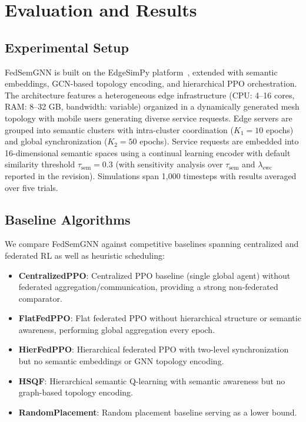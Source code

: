 \section{Evaluation and Results}
\label{sec:evaluation}

\subsection{Experimental Setup}
FedSemGNN is built on the EdgeSimPy platform~\cite{edgesimpy}, extended with semantic embeddings, GCN-based topology encoding, and hierarchical PPO orchestration. The architecture features a heterogeneous edge infrastructure (CPU: 4--16 cores, RAM: 8--32 GB, bandwidth: variable) organized in a dynamically generated mesh topology with mobile users generating diverse service requests. Edge servers are grouped into semantic clusters with intra-cluster coordination ($K_1=10$ epochs) and global synchronization ($K_2=50$ epochs). Service requests are embedded into 16-dimensional semantic spaces using a continual learning encoder with default similarity threshold $\tau_{\text{sem}}=0.3$ (with sensitivity analysis over $\tau_{\text{sem}}$ and $\lambda_{\text{ewc}}$ reported in the revision). Simulations span 1,000 timesteps with results averaged over five trials.

\subsection{Baseline Algorithms}
We compare FedSemGNN against competitive baselines spanning centralized and federated RL as well as heuristic scheduling:

\begin{itemize}
	\item \textbf{CentralizedPPO}: Centralized PPO baseline (single global agent) without federated aggregation/communication, providing a strong non-federated comparator.
	\item \textbf{FlatFedPPO}: Flat federated PPO without hierarchical structure or semantic awareness, performing global aggregation every epoch.
	\item \textbf{HierFedPPO}: Hierarchical federated PPO with two-level synchronization but no semantic embeddings or GNN topology encoding.
	\item \textbf{HSQF}: Hierarchical semantic Q-learning with semantic awareness but no graph-based topology encoding.
	\item \textbf{RandomPlacement}: Random placement baseline serving as a lower bound.
\end{itemize}

